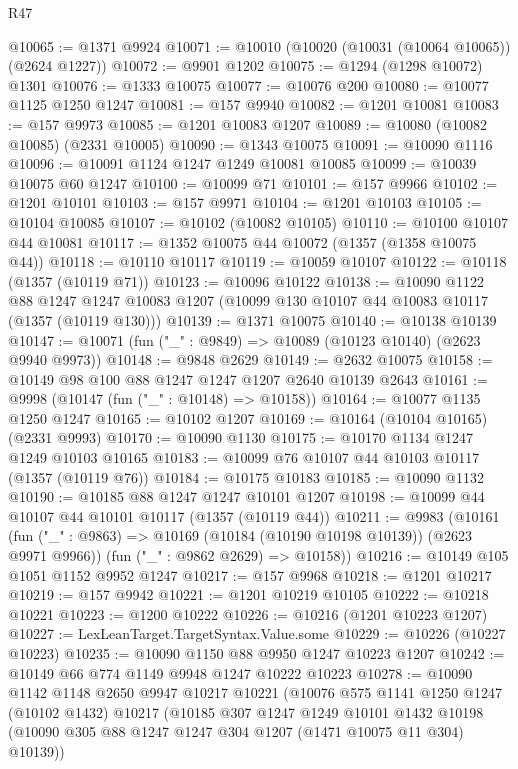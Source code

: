 \begin{lexlean}{R47}
\begin{coremodule}
@10065 := @1371 @9924
@10071 := @10010 (@10020 (@10031 (@10064 @10065)) (@2624 @1227))
@10072 := @9901 @1202
@10075 := @1294 (@1298 @10072) @1301
@10076 := @1333 @10075
@10077 := @10076 @200
@10080 := @10077 @1125 @1250 @1247
@10081 := @157 @9940
@10082 := @1201 @10081
@10083 := @157 @9973
@10085 := @1201 @10083 @1207
@10089 := @10080 (@10082 @10085) (@2331 @10005)
@10090 := @1343 @10075
@10091 := @10090 @1116
@10096 := @10091 @1124 @1247 @1249 @10081 @10085
@10099 := @10039 @10075 @60 @1247
@10100 := @10099 @71
@10101 := @157 @9966
@10102 := @1201 @10101
@10103 := @157 @9971
@10104 := @1201 @10103
@10105 := @10104 @10085
@10107 := @10102 (@10082 @10105)
@10110 := @10100 @10107 @44 @10081
@10117 := @1352 @10075 @44 @10072 (@1357 (@1358 @10075 @44))
@10118 := @10110 @10117
@10119 := @10059 @10107
@10122 := @10118 (@1357 (@10119 @71))
@10123 := @10096 @10122
@10138 := @10090
    @1122
    @88
    @1247
    @1247
    @10083
    @1207
    (@10099 @130 @10107 @44 @10083 @10117 (@1357 (@10119 @130)))
@10139 := @1371 @10075
@10140 := @10138 @10139
@10147 := @10071 (fun ("_" : @9849) => @10089 (@10123 @10140) (@2623 @9940 @9973))
@10148 := @9848 @2629
@10149 := @2632 @10075
@10158 := @10149 @98 @100 @88 @1247 @1247 @1207 @2640 @10139 @2643
@10161 := @9998 (@10147 (fun ("_" : @10148) => @10158))
@10164 := @10077 @1135 @1250 @1247
@10165 := @10102 @1207
@10169 := @10164 (@10104 @10165) (@2331 @9993)
@10170 := @10090 @1130
@10175 := @10170 @1134 @1247 @1249 @10103 @10165
@10183 := @10099 @76 @10107 @44 @10103 @10117 (@1357 (@10119 @76))
@10184 := @10175 @10183
@10185 := @10090 @1132
@10190 := @10185 @88 @1247 @1247 @10101 @1207
@10198 := @10099 @44 @10107 @44 @10101 @10117 (@1357 (@10119 @44))
@10211 := @9983
    (@10161
      (fun ("_" : @9863) => @10169 (@10184 (@10190 @10198 @10139)) (@2623 @9971 @9966))
      (fun ("_" : @9862 @2629) => @10158))
@10216 := @10149 @105 @1051 @1152 @9952 @1247
@10217 := @157 @9968
@10218 := @1201 @10217
@10219 := @157 @9942
@10221 := @1201 @10219 @10105
@10222 := @10218 @10221
@10223 := @1200 @10222
@10226 := @10216 (@1201 @10223 @1207)
@10227 := LexLeanTarget.TargetSyntax.Value.some
@10229 := @10226 (@10227 @10223)
@10235 := @10090 @1150 @88 @9950 @1247 @10223 @1207
@10242 := @10149 @66 @774 @1149 @9948 @1247 @10222 @10223
@10278 := @10090
    @1142
    @1148
    @2650
    @9947
    @10217
    @10221
    (@10076
      @575
      @1141
      @1250
      @1247
      (@10102 @1432)
      @10217
      (@10185
        @307
        @1247
        @1249
        @10101
        @1432
        @10198
        (@10090 @305 @88 @1247 @1247 @304 @1207 (@1471 @10075 @11 @304) @10139))

\end{coremodule}
\end{lexlean}
